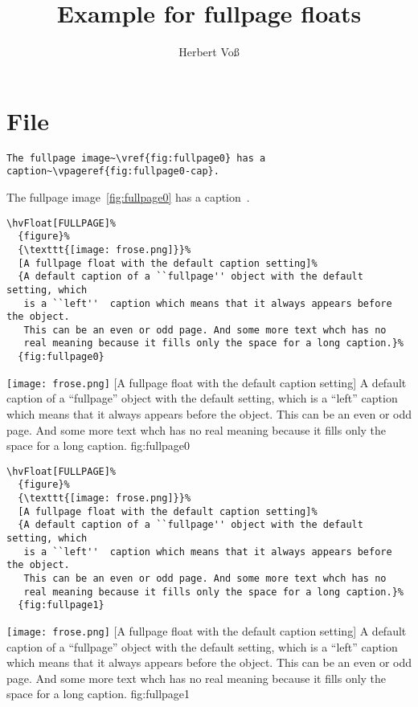 \documentclass{scrartcl}
\begin{document}
\title{Example for fullpage floats}
\author{Herbert Voß}
\maketitle

\tableofcontents
\Blindtext

\blindtext

\section{File \texttt{\jobname}}

\begin{lstlisting}
The fullpage image~\vref{fig:fullpage0} has a caption~\vpageref{fig:fullpage0-cap}.
\end{lstlisting}

The fullpage image~\vref{fig:fullpage0} has a caption~.

\begin{lstlisting}
\hvFloat[FULLPAGE]%
  {figure}%
  {\texttt{[image: frose.png]}}%
  [A fullpage float with the default caption setting]%
  {A default caption of a ``fullpage'' object with the default setting, which
   is a ``left''  caption which means that it always appears before the object.
   This can be an even or odd page. And some more text whch has no
   real meaning because it fills only the space for a long caption.}%
  {fig:fullpage0}
\end{lstlisting}


\Float[default]
%
  {\texttt{[image: frose.png]}}%
  [A fullpage float with the default caption setting]%
  {A default caption of a ``fullpage'' object with the default setting, which
   is a ``left''  caption which means that it always appears before the object.
   This can be an even or odd page. And some more text whch has no
   real meaning because it fills only the space for a long caption.}%
  {fig:fullpage0}

\Blindtext


\begin{lstlisting}
\hvFloat[FULLPAGE]%
  {figure}%
  {\texttt{[image: frose.png]}}%
  [A fullpage float with the default caption setting]%
  {A default caption of a ``fullpage'' object with the default setting, which
   is a ``left''  caption which means that it always appears before the object.
   This can be an even or odd page. And some more text whch has no
   real meaning because it fills only the space for a long caption.}%
  {fig:fullpage1}
\end{lstlisting}


\Float[default]
%
  {\texttt{[image: frose.png]}}%
  [A fullpage float with the default caption setting]%
  {A default caption of a ``fullpage'' object with the default setting, which
   is a ``left''  caption which means that it always appears before the object.
   This can be an even or odd page. And some more text whch has no
   real meaning because it fills only the space for a long caption.}%
  {fig:fullpage1}

\blinddocument


\Blindtext
\end{document}
